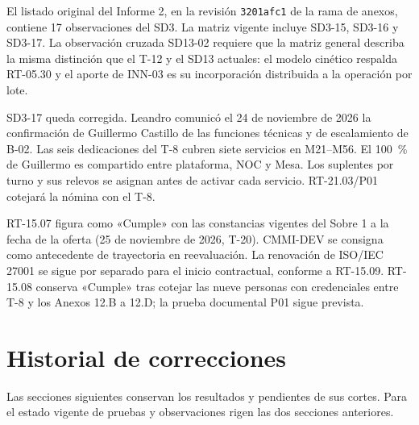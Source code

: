 \documentclass[11pt,letterpaper]{article}
\begin{document}
El listado original del Informe 2, en la revisión \texttt{3201afc1} de la rama de anexos, contiene 17 observaciones del SD3. La matriz vigente incluye SD3-15, SD3-16 y SD3-17. La observación cruzada SD13-02 requiere que la matriz general describa la misma distinción que el T-12 y el SD13 actuales: el modelo cinético respalda RT-05.30 y el aporte de INN-03 es su incorporación distribuida a la operación por lote.

SD3-17 queda corregida. Leandro comunicó el 24 de noviembre de 2026 la confirmación de Guillermo Castillo de las funciones técnicas y de escalamiento de B-02. Las seis dedicaciones del T-8 cubren siete servicios en M21--M56. El 100~\% de Guillermo es compartido entre plataforma, NOC y Mesa. Los suplentes por turno y sus relevos se asignan antes de activar cada servicio. RT-21.03/P01 cotejará la nómina con el T-8.

RT-15.07 figura como «Cumple» con las constancias vigentes del Sobre 1 a la fecha de la oferta (25 de noviembre de 2026, T-20). CMMI-DEV se consigna como antecedente de trayectoria en reevaluación. La renovación de ISO/IEC 27001 se sigue por separado para el inicio contractual, conforme a RT-15.09. RT-15.08 conserva «Cumple» tras cotejar las nueve personas con credenciales entre T-8 y los Anexos 12.B a 12.D; la prueba documental P01 sigue prevista.

\section*{Historial de correcciones}

Las secciones siguientes conservan los resultados y pendientes de sus cortes. Para el estado vigente de pruebas y observaciones rigen las dos secciones anteriores.
\end{document}
